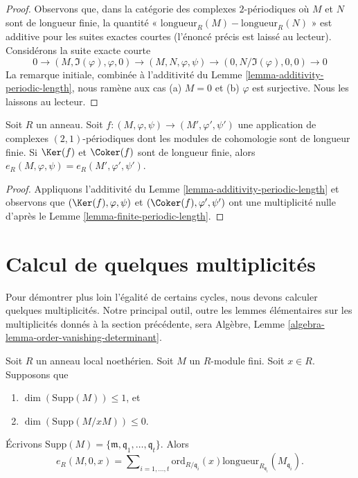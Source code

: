 \begin{proof}
Observons que, dans la catégorie des complexes $2$-périodiques où $M$ et $N$
sont de longueur finie, la quantité « $\text{longueur}_R(M) - \text{longueur}_R(N)$ »
est additive pour les suites exactes courtes (l'énoncé précis est laissé au lecteur).
Considérons la suite exacte courte
$$
0 \to (M, \Im(\varphi), \varphi, 0) \to
(M, N, \varphi, \psi) \to (0, N/\Im(\varphi), 0, 0) \to 0
$$
La remarque initiale, combinée à l'additivité du
Lemme \ref{lemma-additivity-periodic-length},
nous ramène aux cas (a) $M = 0$ et (b) $\varphi$ est surjective.
Nous les laissons au lecteur.
\end{proof}

\begin{lemma}
\label{lemma-compare-periodic-lengths}
Soit $R$ un anneau. Soit $f : (M, \varphi, \psi) \to (M', \varphi', \psi')$
une application de complexes $(2, 1)$-périodiques dont les modules de cohomologie
sont de longueur finie. Si $\Ker(f)$ et $\Coker(f)$ sont de longueur finie,
alors $e_R(M, \varphi, \psi) = e_R(M', \varphi', \psi')$.
\end{lemma}

\begin{proof}
Appliquons l'additivité du Lemme \ref{lemma-additivity-periodic-length}
et observons que $(\Ker(f), \varphi, \psi)$ et
$(\Coker(f), \varphi', \psi')$ ont une multiplicité nulle d'après le
Lemme \ref{lemma-finite-periodic-length}.
\end{proof}




\section{Calcul de quelques multiplicités}
\label{section-calculation}

\noindent
Pour démontrer plus loin l'égalité de certains cycles, nous devons
calculer quelques multiplicités. Notre principal outil, outre les
lemmes élémentaires sur les multiplicités donnés à la section précédente,
sera Algèbre, Lemme \ref{algebra-lemma-order-vanishing-determinant}.

\begin{lemma}
\label{lemma-length-multiplication}
Soit $R$ un anneau local noethérien.
Soit $M$ un $R$-module fini. Soit $x \in R$. Supposons que
\begin{enumerate}
\item $\dim(\text{Supp}(M)) \leq 1$, et
\item $\dim(\text{Supp}(M/xM)) \leq 0$.
\end{enumerate}
Écrivons
$\text{Supp}(M) = \{\mathfrak m, \mathfrak q_1, \ldots, \mathfrak q_t\}$.
Alors
$$
e_R(M, 0, x) =
\sum\nolimits_{i = 1, \ldots, t}
\text{ord}_{R/\mathfrak q_i}(x)
\text{longueur}_{R_{\mathfrak q_i}}(M_{\mathfrak q_i}).
$$
\end{lemma}

